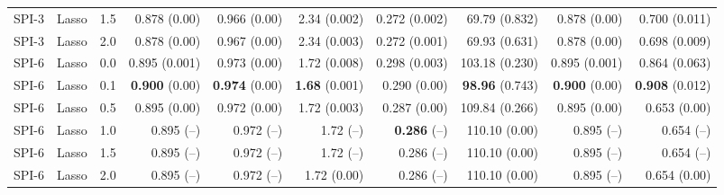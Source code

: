 \begin{table}
\begin{tabular}{rrrrrrrrrr}
  SPI-3 &     Lasso &   1.5 &         0.878 (0.00) &         0.966 (0.00) &         2.34 (0.002) &        0.272 (0.002) &         69.79 (0.832) &         0.878 (0.00) &         0.700 (0.011) \\
  SPI-3 &     Lasso &   2.0 &         0.878 (0.00) &         0.967 (0.00) &         2.34 (0.003) &        0.272 (0.001) &         69.93 (0.631) &         0.878 (0.00) &         0.698 (0.009) \\
  SPI-6 &     Lasso &   0.0 &        0.895 (0.001) &         0.973 (0.00) &         1.72 (0.008) &        0.298 (0.003) &        103.18 (0.230) &        0.895 (0.001) &         0.864 (0.063) \\
  SPI-6 &     Lasso &   0.1 &  { \bf 0.900} (0.00) &  { \bf 0.974} (0.00) &  { \bf 1.68} (0.001) &         0.290 (0.00) &  { \bf 98.96} (0.743) &  { \bf 0.900} (0.00) &  { \bf 0.908} (0.012) \\
  SPI-6 &     Lasso &   0.5 &         0.895 (0.00) &         0.972 (0.00) &         1.72 (0.003) &         0.287 (0.00) &        109.84 (0.266) &         0.895 (0.00) &          0.653 (0.00) \\
  SPI-6 &     Lasso &   1.0 &           0.895 (--) &           0.972 (--) &            1.72 (--) &    { \bf 0.286} (--) &         110.10 (0.00) &           0.895 (--) &            0.654 (--) \\
  SPI-6 &     Lasso &   1.5 &           0.895 (--) &           0.972 (--) &            1.72 (--) &           0.286 (--) &         110.10 (0.00) &           0.895 (--) &            0.654 (--) \\
  SPI-6 &     Lasso &   2.0 &           0.895 (--) &           0.972 (--) &          1.72 (0.00) &           0.286 (--) &         110.10 (0.00) &           0.895 (--) &          0.654 (0.00) \\
\bottomrule
\end{tabular}
\end{table}
